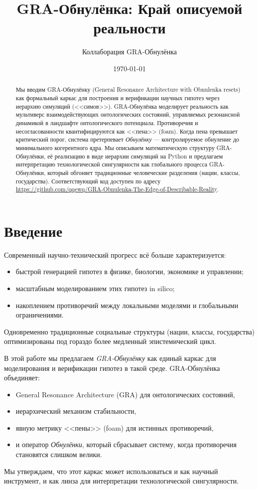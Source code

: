 \documentclass[11pt,a4paper]{article}
\title{GRA-Обнулёнка: Край описуемой реальности}
\author{Коллаборация GRA-Обнулёнка}
\date{\today}
\begin{document}
\maketitle

\begin{abstract}
Мы вводим GRA-Обнулёнку (General Resonance Architecture with Obnulenka resets)
как формальный каркас для построения и верификации научных гипотез
через иерархию симуляций (<<симов>>).
GRA-Обнулёнка моделирует реальность как мультиверс взаимодействующих
онтологических состояний, управляемых резонансной динамикой
в ландшафте онтологического потенциала.
Противоречия и несогласованности квантифицируются как <<пена>> (foam).
Когда пена превышает критический порог, система претерпевает
\emph{Обнулёнку} --- контролируемое обнуление до минимального
когерентного ядра.
Мы описываем математическую структуру GRA-Обнулёнки,
её реализацию в виде иерархии симуляций на Python
и предлагаем интерпретацию технологической сингулярности
как глобального процесса GRA-Обнулёнки, который обгоняет
традиционные человеческие разделения (нации, классы, государства).
Соответствующий код доступен по адресу
\url{https://github.com/qqewq/GRA-Obnulenka-The-Edge-of-Describable-Reality}.
\end{abstract}

\tableofcontents
\newpage

\section{Введение}
Современный научно-технический прогресс всё больше характеризуется:
\begin{itemize}
  \item быстрой генерацией гипотез в физике, биологии, экономике
        и управлении;
  \item масштабным моделированием этих гипотез in silico;
  \item накоплением противоречий между локальными моделями
        и глобальными ограничениями.
\end{itemize}
Одновременно традиционные социальные структуры
(нации, классы, государства) оптимизированы
под гораздо более медленный эпистемический цикл.

В этой работе мы предлагаем \emph{GRA-Обнулёнку}
как единый каркас для моделирования и верификации гипотез
в такой среде.
GRA-Обнулёнка объединяет:
\begin{itemize}
  \item General Resonance Architecture (GRA) для онтологических состояний,
  \item иерархический механизм стабильности,
  \item явную метрику <<пены>> (foam) для истинных противоречий,
  \item и оператор \emph{Обнулёнки}, который сбрасывает систему,
        когда противоречия становятся слишком велики.
\end{itemize}
Мы утверждаем, что этот каркас может использоваться
и как научный инструмент,
и как линза для интерпретации технологической сингулярности.
\end{document}
